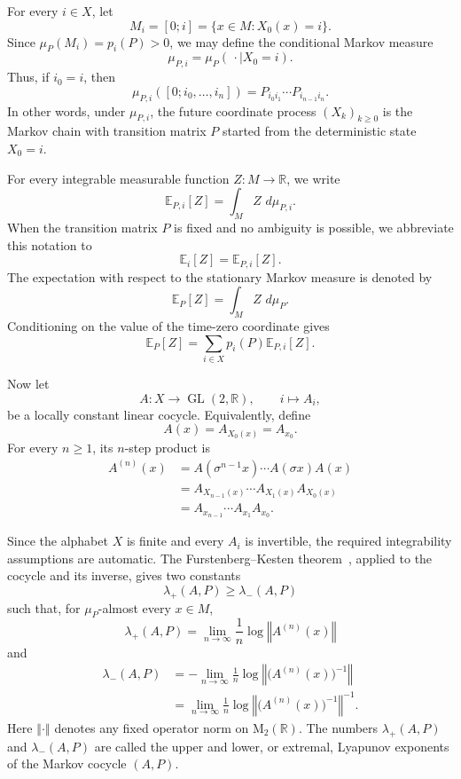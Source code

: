\documentclass[11pt,a4paper]{amsart}
\theoremstyle{definition}
\theoremstyle{remark}
\numberwithin{equation}{section}
\newcommand{\RR}{\mathbb R}
\newcommand{\EE}{\mathbb E}
\newcommand{\dd}{\,d}
\newcommand{\1}{\boldsymbol 1}
\def\GL{\operatorname{GL}}
\newcommand{\norm}[1]{\left\Vert #1 \right\Vert}
\begin{document}
For every $i\in X$, let
$$
M_i=[0;i]
=
\{x\in M:X_0(x)=i\}.
$$
Since $\mu_P(M_i)=p_i(P)>0$, we may define the conditional Markov
measure
$$
\mu_{P,i}
=
\mu_P(\,\cdot\mid X_0=i).
$$
Thus, if $i_0=i$, then
\begin{equation}\label{eq:conditional-path-measure}
\mu_{P,i}([0;i_0,\ldots,i_n])
=
P_{i_0i_1}\cdots P_{i_{n-1}i_n}.
\end{equation}
In other words, under $\mu_{P,i}$, the future coordinate process
$(X_k)_{k\geq 0}$ is the Markov chain with transition matrix $P$
started from the deterministic state $X_0=i$.

For every integrable measurable function $Z:M\to\RR$, we write
$$
\EE_{P,i}[Z]
=
\int_M Z\,\dd\mu_{P,i}.
$$
When the transition matrix $P$ is fixed and no ambiguity is possible,
we abbreviate this notation to
$$
\EE_i[Z]=\EE_{P,i}[Z].
$$
The expectation with respect to the stationary Markov measure is
denoted by
$$
\EE_P[Z]
=
\int_M Z\,\dd\mu_P.
$$
Conditioning on the value of the time-zero coordinate gives
\begin{equation}\label{eq:stationary-expectation-decomposition}
\EE_P[Z]
=
\sum_{i\in X}p_i(P)\EE_{P,i}[Z].
\end{equation}

Now let
$$
A:X\to\GL(2,\RR),
\qquad
i\longmapsto A_i,
$$
be a locally constant linear cocycle. Equivalently, define
$$
A(x)=A_{X_0(x)}=A_{x_0}.
$$
For every $n\geq 1$, its $n$-step product is
\begin{align}
A^{(n)}(x)
&=
A(\sigma^{n-1}x)\cdots A(\sigma x)A(x)
\nonumber\\
&=
A_{X_{n-1}(x)}\cdots A_{X_1(x)}A_{X_0(x)}
\nonumber\\
&=
A_{x_{n-1}}\cdots A_{x_1}A_{x_0}.
\label{eq:markov-cocycle-product}
\end{align}

Since the alphabet $X$ is finite and every $A_i$ is invertible,
the required integrability assumptions are automatic. The
Furstenberg--Kesten theorem~\cite{FK}, applied to the cocycle and its
inverse, gives two constants
$$
\lambda_+(A,P)\geq\lambda_-(A,P)
$$
such that, for $\mu_P$-almost every $x\in M$,
\begin{equation}\label{eq:extremal-lyapunov-exponents}
\lambda_+(A,P)
=
\lim_{n\to\infty}
\frac1n\log\norm{A^{(n)}(x)}
\end{equation}
and
\begin{align}
\lambda_-(A,P)
&=
-\lim_{n\to\infty}
\frac1n\log\norm{\bigl(A^{(n)}(x)\bigr)^{-1}}
\nonumber\\
&=
\lim_{n\to\infty}
\frac1n
\log
\norm{\bigl(A^{(n)}(x)\bigr)^{-1}}^{-1}.
\label{eq:lower-lyapunov-exponent}
\end{align}
Here $\norm{\cdot}$ denotes any fixed operator norm on
$\mathrm{M}_2(\RR)$. The numbers $\lambda_+(A,P)$ and
$\lambda_-(A,P)$ are called the upper and lower, or extremal,
Lyapunov exponents of the Markov cocycle $(A,P)$.
\end{document}
